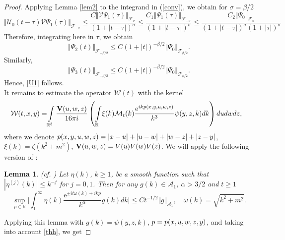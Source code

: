 \documentclass[10pt,a4paper]{amsart}
\newtheorem{lemma}{Lemma}
\newcommand{\E}{\mathrm{e}}
\newcommand{\R}{{\mathbb R}}
\newcommand{\cF}{{\mathcal F}}
\newcommand{\cU}{{\mathcal U}}
\begin{document}
\begin{proof}
 Applying  Lemma \ref{lem2} to the integrand in (\ref{conv}), 
 we obtain for $\sigma=\beta/2$
 \begin{equation*}
 \Vert \cU_0(t-\tau){\mathcal V} \Psi_1(\tau)\Vert_{\cF_{-\sigma}}\le 
 \frac{C\Vert {\mathcal V} \Psi_1(\tau)\Vert_{\cF_{\sigma}}}{(1\!+|t-\!\tau|)^{\sigma}}
 \le\frac{C_1\Vert \Psi_1(\tau)\Vert_{\cF_{-\sigma}}}{(1\!+|t-\!\tau|)^{\sigma}}
  \le\!\frac{C_2\Vert \Psi_0\Vert_{\cF_{\sigma}}}{(1\!+|t-\!\tau|)^{\sigma}(1\!+|\tau|)^{\sigma}}
\end{equation*}  
Therefore, integrating here in $\tau$, we obtain 
\begin{equation*}
  \Vert \Psi_2(t)\Vert_{\cF_{-\beta/2}} \le C (1+|t|)^{-\beta/2}\Vert \Psi_0\Vert_{\cF_{\beta/2}}.
\end{equation*}
Similarly,
\begin{equation*}
  \Vert \Psi_3(t)\Vert_{\cF_{-\beta/2}} \le C (1+|t|)^{-\beta/2}\Vert \Psi_0\Vert_{\cF_{\beta/2}}.
\end{equation*}
Hence, \eqref{U1} follows.
\smallskip\\
It remains to estimate the operator  ${\mathcal W}(t)$ with the kernel
\begin{equation}\label{W}
\!\!\!\!\!{\mathcal W}(t,x,y)
=\!\int\limits_{\R^3} \frac{{\mathbf V}(u,\rm w,z)}{16 \pi i}\left(\int\limits_\R\! \xi(k){\mathcal M}_t(k)
\frac{\E^{ikp(x,y,u,\rm w,z)}}{k^3}\psi(y,z,k)dk\right) dud{\rm w} dz,
\end{equation}
where we denote  $p(x,y,u,\rm w,z)=|x-u|+|u-{\rm w}|+|{\rm w}-z|+|z-y|$,  $\xi(k)=\zeta(k^2+m^2)$,
${\mathbf V}(u,\rm w,z)=V(u)V(\rm w)V(z)$.
We will apply the following version of \cite[Lemma 2]{MSW}:
\begin{lemma}\label{l1} (cf. \cite[Lemma 5.5]{EKTM})
Let $\eta(k)$, $k\geq 1$, be a smooth function such that
 $|\eta^{(j)}(k)|\le k^{-j}$ for $j=0,1$. Then for any $g(k)\in \mathcal A_1$,
 $\alpha> 3/2$ and $t\ge 1$
\begin{equation}\label{OI-est}
\sup\limits_{p\in\R}\Big|\int_{1}^\infty\eta(k)\frac{\E^{\pm it\omega(k)+ ik p}}
{k^\alpha}g(k)dk\Big|\le C t^{-1/2}\Vert g\Vert_{\mathcal A_1} ,\quad \omega(k)=\sqrt{k^2+m^2}.
\end{equation}
\end{lemma}
Applying this lemma with  $g(k)=\psi(y,z,k)$, $p= p(x,u,\rm w,z,y)$, and taking into account \eqref{thh}, we get

\end{proof}
\end{document}
